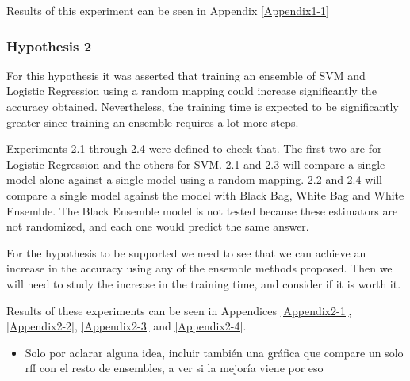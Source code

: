 \begin{pre-delivery}
  Results of this experiment can be seen in Appendix \ref{Appendix1-1}


  \subsubsection*{Hypothesis 2}

  For this hypothesis it was asserted that training an ensemble of SVM and
  Logistic Regression using a random mapping could increase significantly the
  accuracy obtained. Nevertheless, the training time is expected to be
  significantly greater since training an ensemble requires a lot more steps.

  Experiments 2.1 through 2.4 were defined to check that. The first two are for
  Logistic Regression and the others for SVM.
  2.1 and 2.3 will compare a single model alone against a single model using
  a random mapping. 2.2 and 2.4 will compare a single model against the model
  with Black Bag, White Bag and White Ensemble. The Black Ensemble model is not
  tested because these estimators are not randomized, and each one would predict
  the same answer.

  For the hypothesis to be supported we need to see that we can achieve an
  increase in the accuracy using any of the ensemble methods proposed. Then we
  will need to study the increase in the training time, and consider if it
  is worth it.

  Results of these experiments can be seen in Appendices
  \ref{Appendix2-1},
  \ref{Appendix2-2},
  \ref{Appendix2-3} and
  \ref{Appendix2-4}.
  \end{pre-delivery}

  \begin{note}
    \begin{itemize}
      \item Solo por aclarar alguna idea, incluir también una gráfica que
      compare un solo rff con el resto de ensembles, a ver si la mejoría
      viene por eso
    \end{itemize}
  \end{note}

